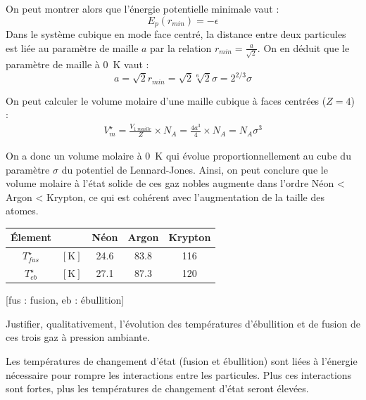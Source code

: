 \begin{exercise}
\begin{questions}
\begin{solution}
On peut montrer alors que l'énergie potentielle minimale vaut :
\[E_p (r_{min}) = -\epsilon\]
Dans le système cubique en mode face centré, la distance entre deux particules est liée au paramètre de maille $a$ par la relation $r_{min} = \frac{a}{\sqrt{2}}$. On en déduit que le paramètre de maille à \SI{0}{\kelvin} vaut :
\[a = \sqrt{2} r_{min} = \sqrt{2} \sqrt[6]{2} \sigma = 2^{2/3} \sigma\]

On peut calculer le volume molaire d'une maille cubique à faces centrées ($Z = 4$) :
\begin{align*}
    V_m^\star = \frac{V_{1 ~ maille}}{Z} \times N_A = \frac{4 a^3}{4} \times N_A = N_A \sigma^3
\end{align*}

On a donc un volume molaire à \SI{0}{\kelvin} qui évolue proportionnellement au cube du paramètre $\sigma$ du potentiel de Lennard-Jones. Ainsi, on peut conclure que le volume molaire à l'état solide de ces gaz nobles augmente dans l'ordre Néon < Argon < Krypton, ce qui est cohérent avec l'augmentation de la taille des atomes.

\end{solution}

\begin{minipage}{0.6\textwidth}
\centering
\begin{tabular}{ccccc}
\toprule
\'{E}lement & & Néon & Argon & Krypton \\
\midrule
$T_{fus}^\star$ & $[\si{\kelvin}]$ & 24.6 & 83.8 & 116 \\
$T_{eb}^\star$ & $[\si{\kelvin}]$ & 27.1 & 87.3 & 120 \\
\bottomrule
\end{tabular}
\end{minipage}\begin{minipage}{0.4\textwidth}
[fus : fusion, eb : ébullition]
\end{minipage}

\question Justifier, qualitativement, l'évolution des températures d'ébullition et de fusion de ces trois gaz à pression ambiante.

\begin{solution}
Les températures de changement d'état (fusion et ébullition) sont liées à l'énergie nécessaire pour rompre les interactions entre les particules. Plus ces interactions sont fortes, plus les températures de changement d'état seront élevées.




\end{solution}
\end{questions}
\end{exercise}
